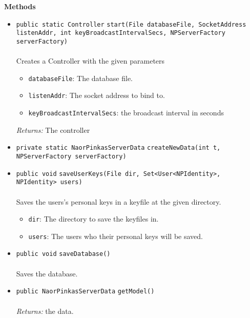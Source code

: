 \textbf{\sffamily Methods}
\begin{itemize}
\item \lstinline|public static Controller| \lstinline|start|\lstinline|(File databaseFile, SocketAddress listenAddr, int keyBroadcastIntervalSecs, NPServerFactory serverFactory)|\\ \\[-0.6em]
Creates a Controller with the given parameters
\begin{itemize}
\item \lstinline|databaseFile|: The database file.
\item \lstinline|listenAddr|: The socket address to bind to.
\item \lstinline|keyBroadcastIntervalSecs|: the broadcast interval in seconds
\end{itemize}

\emph{Returns:} The controller

\item \lstinline|private static NaorPinkasServerData| \lstinline|createNewData|\lstinline|(int t, NPServerFactory serverFactory)| \\[-0.6em]




\item \lstinline|public void| \lstinline|saveUserKeys|\lstinline|(File dir, Set<User<NPIdentity>, NPIdentity> users)|\\ \\[-0.6em]
Saves the users's personal keys in a keyfile at the given directory.
\begin{itemize}
\item \lstinline|dir|: The directory to save the keyfiles in.
\item \lstinline|users|: The users who their personal keys will be saved.
\end{itemize}



\item \lstinline|public void| \lstinline|saveDatabase|\lstinline|()|\\ \\[-0.6em]
Saves the database.



\item \lstinline|public NaorPinkasServerData| \lstinline|getModel|\lstinline|()|\\ \\[-0.6em]
\emph{Returns:} the data.




\end{itemize}

